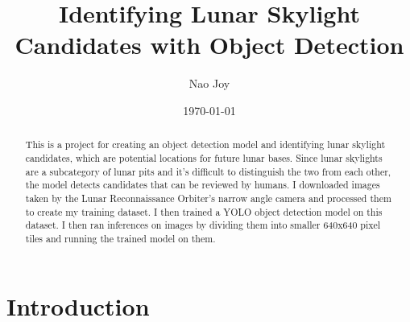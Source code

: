 \documentclass[twoside,10pt]{article}
\title{\fontsize{16}{20}\selectfont\textbf{Identifying Lunar Skylight Candidates with Object Detection}}
\author{
    \fontsize{12}{14}\selectfont
    Nao Joy
}
\date{\today}
\begin{document}
\vspace{-0.5cm}  %

\maketitle

\begin{abstract}
\fontsize{12}{14}\selectfont
\vspace{1em}
\justifying
This is a project for creating an object detection model and identifying lunar skylight candidates, which are potential locations for future lunar bases. Since lunar skylights are a subcategory of lunar pits and it's difficult to distinguish the two from each other, the model detects candidates that can be reviewed by humans. I downloaded images taken by the Lunar Reconnaissance Orbiter's narrow angle camera and processed them to create my training dataset. I then trained a YOLO \cite{Jocher_Ultralytics_YOLO26_Unified_2026} object detection model on this dataset. I then ran inferences on images by dividing them into smaller 640x640 pixel tiles and running the trained model on them.

\end{abstract}

\vspace{1cm}

\section{Introduction}
\fontsize{13}{15}\selectfont

\end{document}
